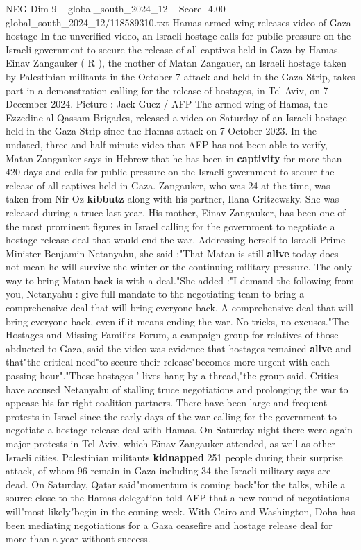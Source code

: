 \begin{textsample}{NEG Dim 9 – global\_south\_2024\_12 – Score -4.00 – global\_south\_2024\_12/118589310.txt}  \label{ex:f9_neg_215}
Hamas armed wing releases video of Gaza hostage In the unverified video, an Israeli hostage calls for public pressure on the Israeli government to secure the release of all captives held in Gaza by Hamas.
Einav Zangauker ( R ), the mother of Matan Zangauer, an Israeli hostage taken by Palestinian militants in the October 7 attack and held in the Gaza Strip, takes part in a demonstration calling for the release of hostages, in Tel Aviv, on 7 December 2024.
Picture : Jack Guez / AFP The armed wing of Hamas, the Ezzedine al-Qassam Brigades, released a video on Saturday of an Israeli hostage held in the Gaza Strip since the Hamas attack on 7 October 2023.
In the undated, three-and-half-minute video that AFP has not been able to verify, Matan Zangauker says in Hebrew that he has been in \textbf{captivity} for more than 420 days and calls for public pressure on the Israeli government to secure the release of all captives held in Gaza.
Zangauker, who was 24 at the time, was taken from Nir Oz \textbf{kibbutz} along with his partner, Ilana Gritzewsky.
She was released during a truce last year.
His mother, Einav Zangauker, has been one of the most prominent figures in Israel calling for the government to negotiate a hostage release deal that would end the war.
Addressing herself to Israeli Prime Minister Benjamin Netanyahu, she said :"That Matan is still \textbf{alive} today does not mean he will survive the winter or the continuing military pressure.
The only way to bring Matan back is with a deal."She added :"I demand the following from you, Netanyahu : give full mandate to the negotiating team to bring a comprehensive deal that will bring everyone back.
A comprehensive deal that will bring everyone back, even if it means ending the war.
No tricks, no excuses."The Hostages and Missing Families Forum, a campaign group for relatives of those abducted to Gaza, said the video was evidence that hostages remained \textbf{alive} and that"the critical need"to secure their release"becomes more urgent with each passing hour"."These hostages ' lives hang by a thread,"the group said.
Critics have accused Netanyahu of stalling truce negotiations and prolonging the war to appease his far-right coalition partners.
There have been large and frequent protests in Israel since the early days of the war calling for the government to negotiate a hostage release deal with Hamas.
On Saturday night there were again major protests in Tel Aviv, which Einav Zangauker attended, as well as other Israeli cities.
Palestinian militants \textbf{kidnapped} 251 people during their surprise attack, of whom 96 remain in Gaza including 34 the Israeli military says are dead.
On Saturday, Qatar said"momentum is coming back"for the talks, while a source close to the Hamas delegation told AFP that a new round of negotiations will"most likely"begin in the coming week.
With Cairo and Washington, Doha has been mediating negotiations for a Gaza ceasefire and hostage release deal for more than a year without success.

\end{textsample}

